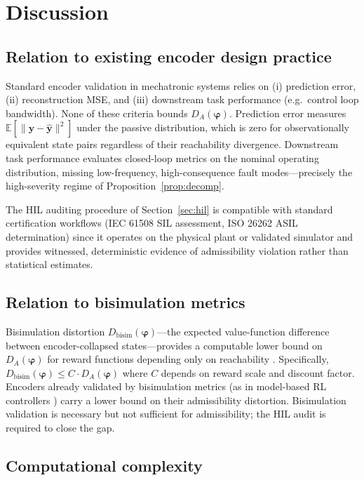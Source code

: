 \documentclass[10pt,twocolumn]{article}
\theoremstyle{plain}
\theoremstyle{definition}
\theoremstyle{remark}
\newcommand{\DA}{D_{A}(\bm{\varphi})}
\newcommand{\bvphi}{\bm{\varphi}}
\newcommand{\E}{\mathbb{E}}
\begin{document}
\section{Discussion}

\subsection{Relation to existing encoder design practice}

Standard encoder validation in mechatronic systems relies on
(i) prediction error, (ii) reconstruction MSE, and
(iii) downstream task performance (e.g.\ control loop bandwidth).
None of these criteria bounds $\DA$. Prediction error measures
$\E[\|\bm{y} - \hat{\bm{y}}\|^2]$ under the passive distribution,
which is zero for observationally equivalent state pairs regardless
of their reachability divergence. Downstream task performance
evaluates closed-loop metrics on the nominal operating distribution,
missing low-frequency, high-consequence fault modes---precisely the
high-severity regime of Proposition~\ref{prop:decomp}.

The HIL auditing procedure of Section~\ref{sec:hil} is compatible with
standard certification workflows (IEC 61508 SIL assessment, ISO 26262
ASIL determination) since it operates on the physical plant or validated
simulator and provides witnessed, deterministic evidence of admissibility
violation rather than statistical estimates.

\subsection{Relation to bisimulation metrics}

Bisimulation distortion $D_{\text{bisim}}(\bvphi)$---the expected
value-function difference between encoder-collapsed states---provides a
computable lower bound on $\DA$ for reward functions depending only on
reachability \citep{ferns2004metrics}. Specifically,
$D_{\text{bisim}}(\bvphi) \leq C \cdot \DA$ where $C$ depends on reward
scale and discount factor. Encoders already validated by bisimulation
metrics (as in model-based RL controllers \citep{zhang2021learning})
carry a lower bound on their admissibility distortion. Bisimulation
validation is necessary but not sufficient for admissibility; the HIL
audit is required to close the gap.

\subsection{Computational complexity}
\end{document}
